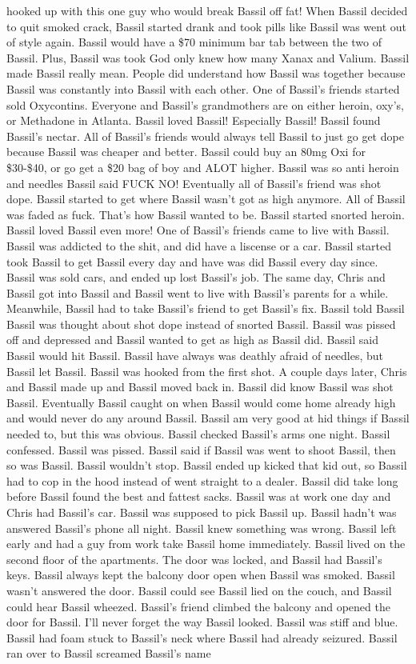 \documentclass[12pt]{book}
\begin{document}
hooked up with this one guy who would break Bassil off fat! When Bassil decided to quit smoked crack, Bassil started drank and took pills like Bassil was went out of style again. Bassil would have a \$70 minimum bar tab between the two of Bassil. Plus, Bassil was took God only knew how many Xanax and Valium. Bassil made Bassil really mean. People did understand how Bassil was together because Bassil was constantly into Bassil with each other. One of Bassil's friends started sold Oxycontins. Everyone and Bassil's grandmothers are on either heroin, oxy's, or Methadone in Atlanta. Bassil loved Bassil! Especially Bassil! Bassil found Bassil's nectar. All of Bassil's friends would always tell Bassil to just go get dope because Bassil was cheaper and better. Bassil could buy an 80mg Oxi for \$30-\$40, or go get a \$20 bag of boy and ALOT higher. Bassil was so anti heroin and needles Bassil said FUCK NO! Eventually all of Bassil's friend was shot dope. Bassil started to get where Bassil wasn't got as high anymore. All of Bassil was faded as fuck. That's how Bassil wanted to be. Bassil started snorted heroin. Bassil loved Bassil even more! One of Bassil's friends came to live with Bassil. Bassil was addicted to the shit, and did have a liscense or a car. Bassil started took Bassil to get Bassil every day and have was did Bassil every day since. Bassil was sold cars, and ended up lost Bassil's job. The same day, Chris and Bassil got into Bassil and Bassil went to live with Bassil's parents for a while. Meanwhile, Bassil had to take Bassil's friend to get Bassil's fix. Bassil told Bassil Bassil was thought about shot dope instead of snorted Bassil. Bassil was pissed off and depressed and Bassil wanted to get as high as Bassil did. Bassil said Bassil would hit Bassil. Bassil have always was deathly afraid of needles, but Bassil let Bassil. Bassil was hooked from the first shot. A couple days later, Chris and Bassil made up and Bassil moved back in. Bassil did know Bassil was shot Bassil. Eventually Bassil caught on when Bassil would come home already high and would never do any around Bassil. Bassil am very good at hid things if Bassil needed to, but this was obvious. Bassil checked Bassil's arms one night. Bassil confessed. Bassil was pissed. Bassil said if Bassil was went to shoot Bassil, then so was Bassil. Bassil wouldn't stop. Bassil ended up kicked that kid out, so Bassil had to cop in the hood instead of went straight to a dealer. Bassil did take long before Bassil found the best and fattest sacks. Bassil was at work one day and Chris had Bassil's car. Bassil was supposed to pick Bassil up. Bassil hadn't was answered Bassil's phone all night. Bassil knew something was wrong. Bassil left early and had a guy from work take Bassil home immediately. Bassil lived on the second floor of the apartments. The door was locked, and Bassil had Bassil's keys. Bassil always kept the balcony door open when Bassil was smoked. Bassil wasn't answered the door. Bassil could see Bassil lied on the couch, and Bassil could hear Bassil wheezed. Bassil's friend climbed the balcony and opened the door for Bassil. I'll never forget the way Bassil looked. Bassil was stiff and blue. Bassil had foam stuck to Bassil's neck where Bassil had already seizured. Bassil ran over to Bassil screamed Bassil's name 
\end{document}
